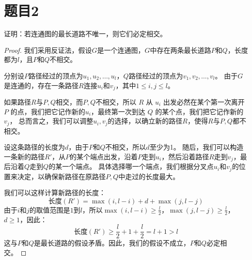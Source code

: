 \documentclass[utf8]{ctexart}
\theoremstyle{mystyle}
\begin{document}
\section*{题目2}
\begin{problembox}
证明：若连通图的最长道路不唯一，则它们必定相交。
\end{problembox}
\begin{proof}
我们采用反证法，假设$G$是一个连通图，$G$中存在两条最长道路$P$和$Q$，长度都为$l$，且$P$和$Q$不相交。

分别设$P$路径经过的顶点为$u_1, u_2, \ldots, u_{l}$，$Q$路径经过的顶点为$v_1, v_2, \ldots, v_{l}$。
由于$G$是连通的，存在一条路径$R$连接$u_i$和$v_j$，其中$1 \leq i, j \leq l$。

如果路径$R$与$P,Q$相交，而$P,Q$不相交，所以 $R$ 从 $u_i$ 出发必然在某个第一次离开 $P$ 的点，我们把它记作新的$u_i$，最终第一次到达 $Q$ 的某个点，我们把它记作新的$v_j$，
总而言之，我们可以调整$u_i,v_j$的选择，以确立新的路径$R$，使得$R$与$P,Q$都不相交。

设这条路径的长度为$d$，由于$P$和$Q$不相交，所以$d$至少为1。
随后，我们可以构造一条新的路径$R'$，从$P$的某个端点出发，沿着$P$走到$u_i$，然后沿着路径$R$走到$v_j$，最后沿着$Q$走到$Q$的某一个端点。
具体选择哪一个端点，我们根据分叉点$u_i$和$v_j$的位置来决定，以确保新路径在原路径$P,Q$中走过的长度最大。

我们可以这样计算新路径的长度：
\[
\text{长度}(R') = \max(i, l-i) + d + \max(j, l-j)
\]
由于$i$和$j$的取值范围是$1$到$l$，所以$\max(i, l-i) \geq \frac{l}{2}$，$\max(j, l-j) \geq \frac{l}{2}$，$d \geq 1$，因此：
\[
\text{长度}(R') \geq \frac{l}{2} + 1 + \frac{l}{2} = l + 1 > l
\]
这与$P$和$Q$是最长道路的假设矛盾。因此，我们的假设不成立，$P$和$Q$必定相交。
\end{proof}
\end{document}
